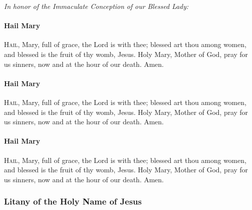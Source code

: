 \documentclass{article}
\begin{document}
\begin{multicols}{3}
\textit{In honor of the Immaculate Conception of our Blessed Lady:}

\paragraph{Hail Mary}

\textsc{Hail}, Mary, full of grace, the Lord is with thee;
blessed art thou among women, and blessed is the fruit of
thy womb, Jesus.  Holy Mary, Mother of God, pray for us sinners,
now and at the hour of our death. Amen.

\paragraph{Hail Mary}

\textsc{Hail}, Mary, full of grace, the Lord is with thee;
blessed art thou among women, and blessed is the fruit of
thy womb, Jesus.  Holy Mary, Mother of God, pray for us sinners,
now and at the hour of our death. Amen.

\paragraph{Hail Mary}

\textsc{Hail}, Mary, full of grace, the Lord is with thee;
blessed art thou among women, and blessed is the fruit of
thy womb, Jesus.  Holy Mary, Mother of God, pray for us sinners,
now and at the hour of our death. Amen.

\subsubsection*{Litany of the Holy Name of Jesus}


\end{multicols}
\end{document}
